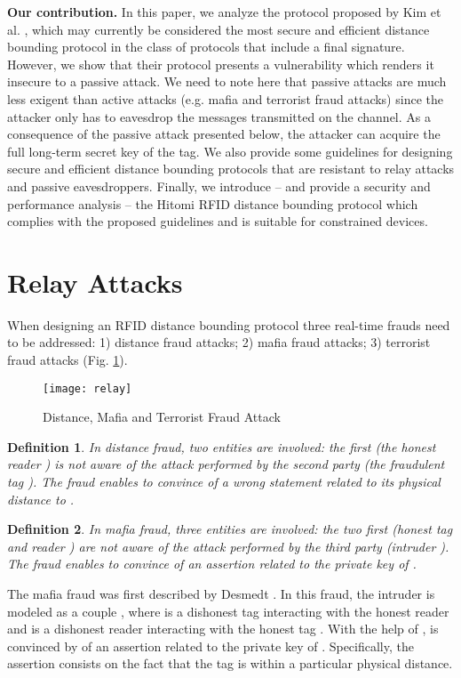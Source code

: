 \documentclass{article}
\newtheorem{definition}{Definition}
\begin{document}
\textbf{Our contribution.} In this paper, we analyze the protocol proposed by Kim et al. \cite{KimAKSP-2008-icisc}, which may currently be considered the most secure and efficient distance bounding protocol in the class of protocols that include a final signature. However, we show that their protocol presents a vulnerability which renders it insecure to a passive attack. We need to note here that passive attacks are much less exigent than active attacks (e.g. mafia and terrorist fraud attacks) since the attacker only has to eavesdrop the messages transmitted on the channel. As a consequence of the passive attack presented below,  the attacker can acquire the full long-term secret key of the tag. We also provide some guidelines for designing secure and efficient distance bounding protocols that are resistant to relay attacks and passive eavesdroppers. Finally, we introduce -- and provide a security and performance analysis --  the Hitomi RFID distance bounding protocol which complies with the proposed guidelines and is suitable for constrained devices.

\section{Relay Attacks}

When designing an RFID distance bounding protocol three real-time frauds \cite{Bussard-2004-thesis,BussardB05} need to be addressed: 1) distance fraud attacks; 2) mafia fraud attacks; 3) terrorist fraud attacks (Fig. \ref{fig::relay}).

\begin{figure}
\centering
\texttt{[image: relay]}\\
\caption{Distance, Mafia and Terrorist Fraud Attack }
\label{fig::relay}
\end{figure}



\begin{definition}
In distance fraud, two entities are involved: the first (the honest reader ) is not aware of the attack performed by the second party (the fraudulent tag ).  The fraud enables  to convince  of a wrong statement related to its physical distance to .
\end{definition}

\begin{definition}
In mafia fraud, three entities are involved: the two first (honest tag  and reader ) are not aware of the attack performed by the third party (intruder ). The fraud enables  to convince  of an assertion related to the private key of .
\end{definition}
The mafia fraud was first described by Desmedt \cite{desmedt}. In this fraud, the intruder is modeled as a couple , where  is a dishonest tag interacting with the honest reader  and   is a dishonest reader interacting with the honest tag . With the help of ,  is convinced by  of an assertion related to the private key of . Specifically, the assertion consists on the fact that the tag  is within a particular physical distance.
\end{document}

